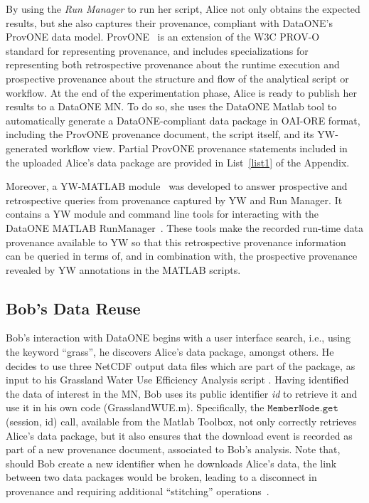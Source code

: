 \documentclass[a4paper]{llncs}
\newcommand{\mytt}[1]{\ensuremath{\mathtt{#1}}}
\newcommand{\authornote}[2] {
    \begin{center}
        \framebox{
            {\begin{minipage}[t]{0.9\linewidth}
                \color{red}
                \raggedright  \textbf{[#1]}~ \scriptsize #2 \normalsize
            \end{minipage}}
    }
    \end{center}
}
\begin{document}
By using the \emph{Run Manager} to run her script, Alice not only obtains the expected results, but she also captures their provenance, compliant with DataONE's ProvONE data model. 
ProvONE~\cite{provone} is an extension of the W3C PROV-O~\cite{prov-o} standard for representing provenance, and includes specializations for representing both retrospective provenance about the runtime execution and prospective provenance about the structure and flow of the analytical script or workflow.
%
At the end of the experimentation phase, Alice is ready to publish her results to a DataONE MN. 
To do so, she uses the  DataONE Matlab tool to automatically generate a DataONE-compliant data package in OAI-ORE format, including the ProvONE provenance document, the script itself, and its YW-generated workflow view. Partial ProvONE provenance statements included in the uploaded Alice's data package are provided in List~\ref{list1} of the Appendix.


Moreover, a YW-MATLAB module~\cite{yw-matlab} was developed to answer prospective and retrospective queries from provenance captured by YW and Run Manager. It contains a YW module and command line tools for interacting with the DataONE MATLAB RunManager~\cite{matlabdataone}. These tools make the recorded run-time data provenance available to YW so that this retrospective provenance information can be queried in terms of, and in combination with, the prospective provenance revealed by YW annotations in the MATLAB scripts.


\subsection{Bob's Data Reuse}

Bob's interaction with DataONE begins with a user interface search, i.e., using the keyword ``grass'', he discovers Alice's data package, amongst others. 
He decides to use three NetCDF output data files which are part of the package, as input to his Grassland Water Use Efficiency Analysis script . 
Having identified the data of interest in the MN, Bob uses its public identifier \textit{id} to retrieve it and use it in his own code (GrasslandWUE.m).
Specifically, the \mytt{MemberNode.get}(session, id)  call, available from the Matlab Toolbox, not only correctly retrieves Alice's data package, but it also ensures that the download event is recorded as part of a new provenance document, associated to Bob's analysis.
%
Note that, should Bob create a new identifier when he downloads Alice's data, the link between two data packages would be broken, leading to a disconnect in provenance and requiring additional ``stitching'' operations~\cite{missing-link}.  
\end{document}
